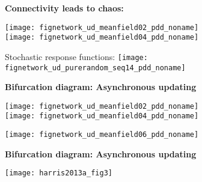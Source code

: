   \textbf{Connectivity leads to chaos:}

      
    \texttt{[image: fignetwork\_ud\_meanfield02\_pdd\_noname]}\\
    \texttt{[image: fignetwork\_ud\_meanfield04\_pdd\_noname]} 
    
    Stochastic response functions:
    \texttt{[image: fignetwork\_ud\_purerandom\_seq14\_pdd\_noname]}  
    



  
  \textbf{Bifurcation diagram: Asynchronous updating}

      
    \texttt{[image: fignetwork\_ud\_meanfield02\_pdd\_noname]} \\
    \texttt{[image: fignetwork\_ud\_meanfield04\_pdd\_noname]} 
    
    \texttt{[image: fignetwork\_ud\_meanfield06\_pdd\_noname]}  
    

  \textbf{Bifurcation diagram: Asynchronous updating}

    \texttt{[image: harris2013a\_fig3]}  
  



